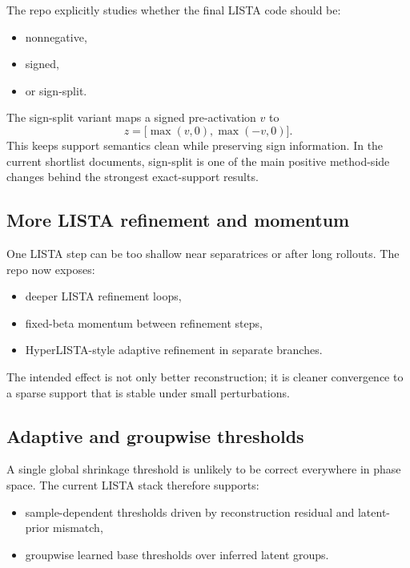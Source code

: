 \documentclass[11pt]{article}
\begin{document}
The repo explicitly studies whether the final LISTA code should be:
\begin{itemize}[leftmargin=1.5em]
    \item nonnegative,
    \item signed,
    \item or sign-split.
\end{itemize}

The sign-split variant maps a signed pre-activation $v$ to
\begin{equation}
    z = \bigl[\max(v,0), \max(-v,0)\bigr].
\end{equation}
This keeps support semantics clean while preserving sign information. In the
current shortlist documents, sign-split is one of the main positive method-side
changes behind the strongest exact-support results.

\subsection{More LISTA refinement and momentum}

One LISTA step can be too shallow near separatrices or after long rollouts. The
repo now exposes:
\begin{itemize}[leftmargin=1.5em]
    \item deeper LISTA refinement loops,
    \item fixed-beta momentum between refinement steps,
    \item HyperLISTA-style adaptive refinement in separate branches.
\end{itemize}

The intended effect is not only better reconstruction; it is cleaner
convergence to a sparse support that is stable under small perturbations.

\subsection{Adaptive and groupwise thresholds}

A single global shrinkage threshold is unlikely to be correct everywhere in
phase space. The current LISTA stack therefore supports:
\begin{itemize}[leftmargin=1.5em]
    \item sample-dependent thresholds driven by reconstruction residual and
    latent-prior mismatch,
    \item groupwise learned base thresholds over inferred latent groups.
\end{itemize}
\end{document}

